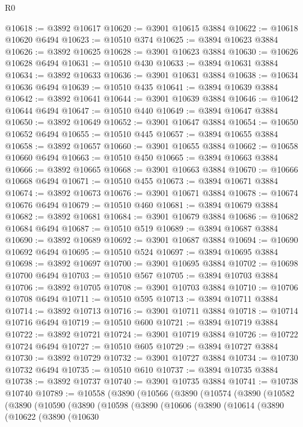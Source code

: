 \begin{lexlean}{R0}
\begin{coremodule}
@10618 := @3892 @10617
@10620 := @3901 @10615 @3884
@10622 := @10618 @10620 @6494
@10623 := @10510 @374
@10625 := @3894 @10623 @3884
@10626 := @3892 @10625
@10628 := @3901 @10623 @3884
@10630 := @10626 @10628 @6494
@10631 := @10510 @430
@10633 := @3894 @10631 @3884
@10634 := @3892 @10633
@10636 := @3901 @10631 @3884
@10638 := @10634 @10636 @6494
@10639 := @10510 @435
@10641 := @3894 @10639 @3884
@10642 := @3892 @10641
@10644 := @3901 @10639 @3884
@10646 := @10642 @10644 @6494
@10647 := @10510 @440
@10649 := @3894 @10647 @3884
@10650 := @3892 @10649
@10652 := @3901 @10647 @3884
@10654 := @10650 @10652 @6494
@10655 := @10510 @445
@10657 := @3894 @10655 @3884
@10658 := @3892 @10657
@10660 := @3901 @10655 @3884
@10662 := @10658 @10660 @6494
@10663 := @10510 @450
@10665 := @3894 @10663 @3884
@10666 := @3892 @10665
@10668 := @3901 @10663 @3884
@10670 := @10666 @10668 @6494
@10671 := @10510 @455
@10673 := @3894 @10671 @3884
@10674 := @3892 @10673
@10676 := @3901 @10671 @3884
@10678 := @10674 @10676 @6494
@10679 := @10510 @460
@10681 := @3894 @10679 @3884
@10682 := @3892 @10681
@10684 := @3901 @10679 @3884
@10686 := @10682 @10684 @6494
@10687 := @10510 @519
@10689 := @3894 @10687 @3884
@10690 := @3892 @10689
@10692 := @3901 @10687 @3884
@10694 := @10690 @10692 @6494
@10695 := @10510 @524
@10697 := @3894 @10695 @3884
@10698 := @3892 @10697
@10700 := @3901 @10695 @3884
@10702 := @10698 @10700 @6494
@10703 := @10510 @567
@10705 := @3894 @10703 @3884
@10706 := @3892 @10705
@10708 := @3901 @10703 @3884
@10710 := @10706 @10708 @6494
@10711 := @10510 @595
@10713 := @3894 @10711 @3884
@10714 := @3892 @10713
@10716 := @3901 @10711 @3884
@10718 := @10714 @10716 @6494
@10719 := @10510 @600
@10721 := @3894 @10719 @3884
@10722 := @3892 @10721
@10724 := @3901 @10719 @3884
@10726 := @10722 @10724 @6494
@10727 := @10510 @605
@10729 := @3894 @10727 @3884
@10730 := @3892 @10729
@10732 := @3901 @10727 @3884
@10734 := @10730 @10732 @6494
@10735 := @10510 @610
@10737 := @3894 @10735 @3884
@10738 := @3892 @10737
@10740 := @3901 @10735 @3884
@10741 := @10738 @10740
@10789 := @10558
    (@3890
      (@10566
        (@3890
          (@10574
            (@3890
              (@10582
                (@3890
                  (@10590
                    (@3890
                      (@10598
                        (@3890
                          (@10606
                            (@3890
                              (@10614
                                (@3890
                                  (@10622
                                    (@3890
                                      (@10630

\end{coremodule}
\end{lexlean}
